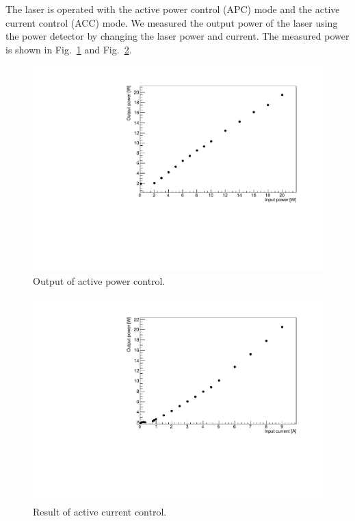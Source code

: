 The laser is operated with the active power control (APC) mode and the active current control (ACC) mode.
We measured the output power of the laser using the power detector by changing the laser power and current. The measured power is shown in Fig.~\ref{fig:APC} and Fig.~\ref{fig:ACC}. 


\begin{figure}
\begin{center}
\includegraphics[bb=20 255 587 641,width=12cm]{Figures/20190128_APC.pdf}
\caption{Output of active power control.} 
\label{fig:APC} 
\end{center}
\end{figure}

\begin{figure}
\begin{center}
\includegraphics[bb=20 255 587 641,width=12cm]{Figures/20190128_ACC.pdf}
\caption{Result of active current control.} 
\label{fig:ACC} 
\end{center}
\end{figure}

